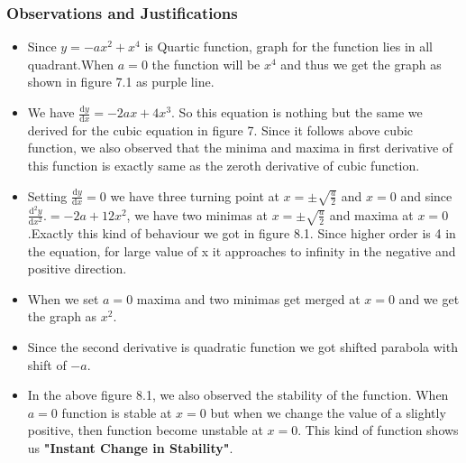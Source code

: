 \documentclass{article}
\begin{document}
\subsubsection{Observations and Justifications}
\begin{itemize}
    \item Since $y = −ax^{2} + x^{4}$ is Quartic function, graph for the function lies in all quadrant.When $a=0$ the function will be $x^4$ and thus we get the graph as shown in figure 7.1 as purple line.  
    \item We have $\frac{\mathrm{d}y}{\mathrm{d}x} = -2ax + 4x^3$. So this equation is nothing but the same we derived for the cubic equation in figure 7.
    Since it follows above cubic function, we also observed that the minima and maxima in first derivative of this function is exactly same as the zeroth derivative of cubic function. 
    \item Setting $\frac{\mathrm{d}y}{\mathrm{d}x} = 0$ we have three turning point at $x = \pm\sqrt{\frac{a}{2}}$ and $x = 0$ and since $\frac{\mathrm{d^2}y}{\mathrm{d}x^2} .= -2a + 12x^2$, we have two minimas at $x = \pm\sqrt{\frac{a}{2}}$ and maxima at $x = 0$.Exactly this kind of behaviour we got in figure 8.1. Since higher order is 4 in the equation, for large value of x it approaches to infinity in the negative and positive direction.
    \item When we set $a = 0$ maxima and two minimas get merged at $ x = 0$ and we get the graph as $x^2$.
    \item Since the second derivative is quadratic function we got shifted parabola with shift of $-a$.
    \item In the above figure 8.1, we also observed the stability of the function. When $a=0$ function is stable at $x=0$ but when we change the value of a slightly positive, then function become unstable at $x = 0$. This kind of function shows us \textbf{"Instant Change in Stability"}.
\end{itemize}
	
\end{document}
